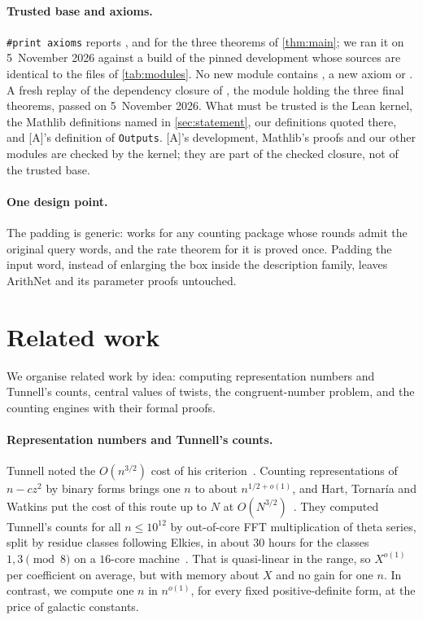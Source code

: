 \documentclass[10pt]{amsart}
\theoremstyle{plain}
\theoremstyle{definition}
\theoremstyle{remark}
\numberwithin{equation}{section}
\newcommand{\A}{\textup{[A]}}
\begin{document}
\paragraph{Trusted base and axioms.} \texttt{\#print axioms} reports , 
and  for the three theorems of \cref{thm:main}; we ran it on 5~November 2026 against a build of
the pinned development whose sources are identical to the files of \cref{tab:modules}. No new module contains
, a new axiom or .
A fresh  replay of the dependency closure of , the module
holding the three final theorems, passed on 5~November 2026.
What must be trusted is the Lean kernel, the Mathlib definitions named in \cref{sec:statement}, our definitions
quoted there, and \A's definition of \texttt{Outputs}. \A's development, Mathlib's proofs and our other modules
are checked by the kernel; they are part of the checked closure, not of the trusted base.

\paragraph{One design point.} The padding is generic:  works for any counting
package whose rounds admit the original query words, and the rate theorem for it is proved once. Padding the
input word, instead of enlarging the box inside the description family, leaves ArithNet and its parameter proofs
untouched.

\section{Related work}\label{sec:related}

We organise related work by idea: computing representation numbers and Tunnell's counts, central values of
twists, the congruent-number problem, and the counting engines with their formal proofs.

\paragraph{Representation numbers and Tunnell's counts.} Tunnell noted the $O(n^{3/2})$ cost of his
criterion~\cite[p.~325]{Tun83}. Counting representations of $n-cz^2$ by binary forms brings one $n$ to about
$n^{1/2+o(1)}$, and Hart, Tornar\'ia and Watkins put the cost of this route up to $N$ at
$O(N^{3/2})$~\cite[\S1.3]{HTW10}. They computed Tunnell's counts for all $n\le10^{12}$ by out-of-core FFT
multiplication of theta series, split by residue classes following Elkies, in about $30$ hours for the classes
$1,3\pmod8$ on a $16$-core machine~\cite{HTW10}. That is quasi-linear in the range, so $X^{o(1)}$ per coefficient
on average, but with memory about $X$ and no gain for one $n$. In contrast, we compute one $n$ in $n^{o(1)}$, for
every fixed positive-definite form, at the price of galactic constants.
\end{document}
